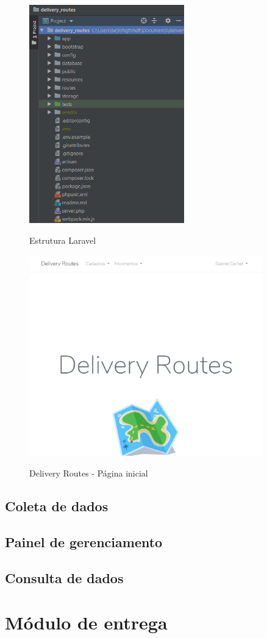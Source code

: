 \begin{figure}[H]
    \centering
    \caption{Estrutura Laravel}
    \includegraphics[width=0.6\textwidth]{./dados/figuras/fig6}
    \label{fig:base-projeto}
\end{figure}

\begin{figure}[H]
    \centering
    \caption{Delivery Routes - Página inicial}
    \includegraphics[width=0.9\textwidth]{./dados/figuras/fig7}
    \label{fig:apphome}
\end{figure}

\subsection{Coleta de dados}

\subsection{Painel de gerenciamento}

\subsection{Consulta de dados}

\section{Módulo de entrega}